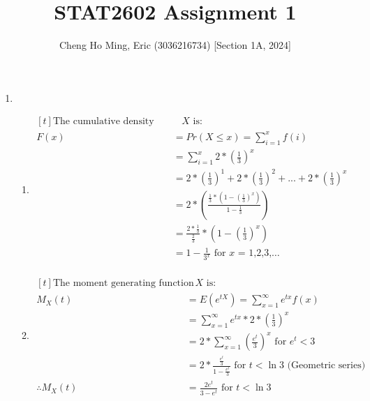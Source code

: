 \documentclass{article}
\title{STAT2602 Assignment 1}
\author{Cheng Ho Ming, Eric (3036216734) [Section 1A, 2024]}
\begin{document}
\maketitle

\begin{enumerate}
\item
    \begin{enumerate}[label=(\roman*)]
    \item $\begin{aligned}[t]
    \text{The cumulative density function of } X \text{ is:} \\
    F(x) &= Pr(X \leq x) = \sum_{i=1}^{x} f(i) \\
    &= \sum_{i=1}^{x} 2*(\frac{1}{3})^x \\
    &= 2*(\frac{1}{3})^1 + 2*(\frac{1}{3})^2 + ... + 2*(\frac{1}{3})^x \\
    &= 2*(\frac{\frac{1}{3}*(1-(\frac{1}{3})^x)}{1-\frac{1}{3}}) \\
    &= \frac{2*\frac{1}{3}}{\frac{2}{3}}*(1-(\frac{1}{3})^x) \\
    &= 1-\frac{1}{3^x} \text{ for } x \text{ = 1,2,3,}\dots \\
    \end{aligned}$

    \item $\begin{aligned}[t]
    \text{The moment generating function (m.g.f.) of } X \text{ is:} \\
    M_X(t) &= E(e^{tX}) = \sum_{x=1}^{\infty} e^{tx}f(x) \\
    &= \sum_{x=1}^{\infty} e^{tx}*2*(\frac{1}{3})^x \\
    &= 2*\sum_{x=1}^{\infty} (\frac{e^t}{3})^x \text{ for } e^t < 3 \\
    &= 2*\frac{\frac{e^t}{3}}{1-\frac{e^t}{3}} \text{ for } t < \ln 3 \text{ (Geometric series)}\\
    \therefore M_X(t) &= \frac{2e^t}{3-e^t} \text{ for } t < \ln 3
    \end{aligned}$


\end{enumerate}
\end{enumerate}
\end{document}
